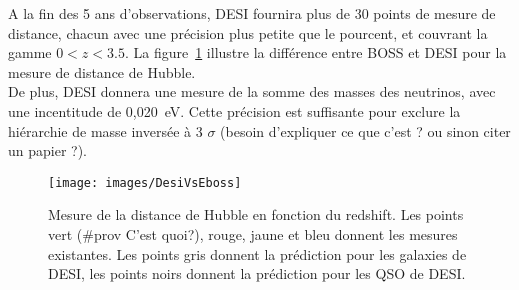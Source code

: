 \documentclass[11pt, twoside, a4paper, openright]{report}
\begin{document}
A la fin des 5 ans d'observations, DESI fournira plus de 30 points de mesure de distance, chacun avec une précision plus petite que le pourcent, et couvrant la gamme $0 < z < 3.5$. La figure~\ref{fig:DesiVsEboss} illustre la différence entre BOSS et DESI pour la mesure de distance de Hubble.\\
De plus, DESI donnera une mesure de la somme des masses des neutrinos, avec une incentitude de 0,020~eV. Cette précision est suffisante pour exclure la hiérarchie de masse inversée à 3 $\sigma$ (besoin d'expliquer ce que c'est ? ou sinon citer un papier ?).

\begin{figure}
  \centering
  \texttt{[image: images/DesiVsEboss]}
  \caption{Mesure de la distance de Hubble en fonction du redshift. Les points vert (\#prov C'est quoi?), rouge, jaune et bleu donnent les mesures existantes. Les points gris donnent la prédiction pour les galaxies de DESI, les points noirs donnent la prédiction pour les QSO de DESI.}
  \label{fig:DesiVsEboss}
\end{figure}



\end{document}
